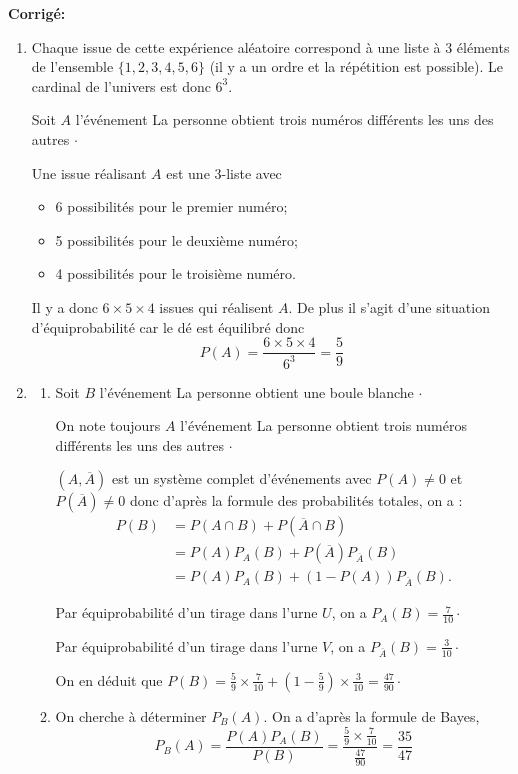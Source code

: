 \documentclass[a4paper,twoside,french,10pt]{VcCours}
\newcommand{\corr}{\textbf{Corrigé:}}
\begin{document}
\corr \begin{enumerate}
\item Chaque issue de cette expérience aléatoire correspond à une liste à $3$ éléments de l'ensemble $\{1,2,3,4,5,6\}$ (il y a un ordre et la répétition est possible). Le cardinal de l'univers est donc $6^3$.

\noindent Soit $A$ l'événement \og La personne obtient trois numéros différents les uns des autres \fg $\cdot$

\noindent Une issue réalisant $A$ est une 3-liste avec
\begin{itemize}
 \item 6 possibilités pour le premier numéro;
 \item 5 possibilités pour le deuxième numéro;
 \item 4 possibilités pour le troisième numéro.
\end{itemize}
Il y a donc $6\times 5\times 4$ issues qui réalisent $A$. De plus il s'agit d'une situation d'équiprobabilité car le dé est équilibré donc
$$P(A) = \frac{6\times 5\times 4}{6^3} = \frac 59$$

\item 
\begin{enumerate}
\item Soit $B$ l'événement \og La personne obtient une boule blanche \fg $\cdot$

\noindent On note toujours $A$ l'événement \og La personne obtient trois numéros différents les uns des autres \fg $\cdot$

\noindent $(A,\overline{A})$ est un système complet d'événements avec $P(A) \neq 0$ et $P(\overline{A}) \neq 0$ donc d'après la formule des probabilités totales, on a :
\begin{align*}
 P(B)&=P(A \cap B)+P(\overline{A} \cap B)\\
 &=P(A)P_{A}(B)+P(\overline{A})P_{\overline{A}}(B)\\
 &=P(A)P_{A}(B)+(1-P(A))P_{\overline{A}}(B).
\end{align*}

\noindent Par équiprobabilité d'un tirage dans l'urne $U$, on a ${P_{A}(B)=\frac 7{10}}\cdot$

\noindent Par équiprobabilité d'un tirage dans l'urne $V$, on a ${P_{\overline{A}}(B)= \frac 3{10}}\cdot$

\noindent On en déduit que ${P(B)=\frac 59 \times \frac 7{10}+\left(1-\frac 59\right) \times \frac 3 {10}=\frac{47}{90}\cdot}$

\item On cherche à déterminer $P_B(A)$. On a d'après la formule de Bayes, 
$$P_B(A)=\frac{P(A)P_A(B)}{P(B)}=\frac{\frac 59 \times \frac 7{10}}{\frac{47}{90}}=\frac{35}{47}$$
\end{enumerate}
\end{enumerate}
\end{document}
